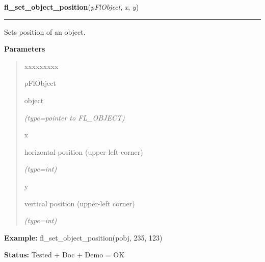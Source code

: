 \hspace{.8\funcindent}\begin{boxedminipage}{\funcwidth}

    \raggedright \textbf{fl\_set\_object\_position}(\textit{pFlObject}, \textit{x}, \textit{y})

    \vspace{-1.5ex}

    \rule{\textwidth}{0.5\fboxrule}
\setlength{\parskip}{2ex}
    Sets position of an object.

\setlength{\parskip}{1ex}
      \textbf{Parameters}
      \vspace{-1ex}

      \begin{quote}
        \begin{Ventry}{xxxxxxxxx}

          \item[pFlObject]

          object

            {\it (type=pointer to FL\_OBJECT)}

          \item[x]

          horizontal position (upper-left corner)

            {\it (type=int)}

          \item[y]

          vertical position (upper-left corner)

            {\it (type=int)}

        \end{Ventry}

      \end{quote}

\textbf{Example:} fl\_set\_object\_position(pobj, 235, 123)



\textbf{Status:} Tested + Doc + Demo = OK



    \end{boxedminipage}

    \label{xformslib:flbasic:fl_get_object_size}

    \vspace{0.5ex}

